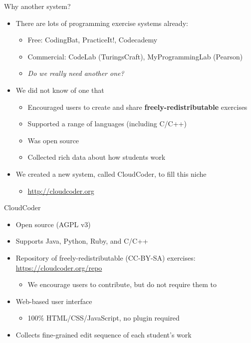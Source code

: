 \documentclass{beamer}
\begin{document}
\begin{frame}{Why another system?}

\begin{itemize}
  \item There are lots of programming exercise systems already:
  \begin{itemize}
    \item Free: CodingBat, PracticeIt!, Codecademy
    \item Commercial: CodeLab (TuringsCraft), MyProgrammingLab (Pearson)
    \item {\em Do we really need another one?}
  \end{itemize}
  \item We did not know of one that
  \begin{itemize}
    \item Encouraged users to create and share {\bf freely-redistributable} exercises
    \item Supported a range of languages (including C/C++)
    \item Was open source
    \item Collected rich data about how students work
  \end{itemize}
  \item We created a new system, called CloudCoder, to fill this niche
    \begin{itemize}
    \item \url{http://cloudcoder.org}
    \end{itemize}
\end{itemize}

\end{frame}

\begin{frame}{CloudCoder}

\begin{itemize}
  \item Open source (AGPL v3)
  \item Supports Java, Python, Ruby, and C/C++
  \item Repository of freely-redistributable (CC-BY-SA) exercises:
        \url{https://cloudcoder.org/repo}
    \begin{itemize}
    \item We encourage users to contribute, but do not require them to
    \end{itemize}
  \item Web-based user interface
    \begin{itemize}
    \item 100\% HTML/CSS/JavaScript, no plugin required
    \end{itemize}
  \item Collects fine-grained edit sequence of each student's work
\end{itemize}

\end{frame}
\end{document}
